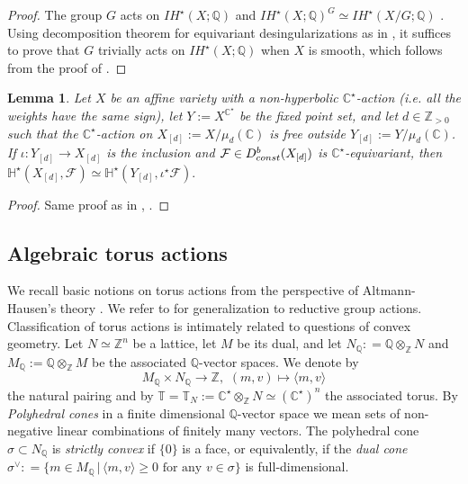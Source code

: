 \documentclass[11pt, reqno]{amsart}
\theoremstyle{plain}
\newtheorem{lemma}[theorem]{Lemma}
\theoremstyle{definition}
\theoremstyle{remark}
\begin{document}
\begin{proof}
The group $G$ acts on $IH^{\star}(X;\mathbb{Q})$ and $IH^{\star}(X;\mathbb{Q})^{G}\simeq IH^{\star}(X/G;\mathbb{Q})$ \cite[Lemma 2.12]{Kir86}.
Using decomposition theorem for equivariant desingularizations as in \cite{AW97}, it suffices 
to prove that $G$ trivially acts on $IH^{\star}(X;\mathbb{Q})$ when $X$ is smooth, which follows from the proof of \cite[Proposition 6.4]{DL76}. 
\end{proof}
\begin{lemma} \label{LemmaCstarfixepointLemma}
Let $X$ be an affine variety with a non-hyperbolic $\mathbb{C}^{\star}$-action (i.e. all the weights have the same sign), let 
$Y :=  X^{\mathbb{C}^{\star}}$ be the fixed point set, and let $d\in\mathbb{Z}_{>0}$ such that 
the $\mathbb{C}^{\star}$-action on $X_{[d]}:= X/\mu_{d}(\mathbb{C})$ is free outside $Y_{[d]}:=Y/\mu_{d}(\mathbb{C})$.
If $\iota: Y_{[d]}\rightarrow X_{[d]}$ is the inclusion and $\mathcal{F}\in D_{\rm const}^{b}(X_{[d]})$ is $\mathbb{C}^{\star}$-equivariant,  then 
$\mathbb{H}^{\star}(X_{[d]}, \mathcal{F}) \simeq \mathbb{H}^{\star}(Y_{[d]}, \iota^{\star}\mathcal{F}).$
\end{lemma}
\begin{proof}
Same proof as in \cite[Lemma 6.5]{DL91}, \cite[Lemma 4.2]{CMM18}.
\end{proof}


\subsection{Algebraic torus actions}\label{sec-class-act}
We recall basic notions on torus actions from the perspective of Altmann-Hausen's theory \cite{AIPSV12}. We refer to \cite{Tim97, LT16, Lan16} for generalization to reductive group actions.
\\

Classification of  torus actions is intimately related to questions of convex geometry.
Let $N\simeq \mathbb{Z}^{n}$ be a lattice, let $M$ be its dual, and let 
$N_{\mathbb{Q}}: =  \mathbb{Q}\otimes_{\mathbb{Z}}N$
and $M_{\mathbb{Q}}:= \mathbb{Q}\otimes_{\mathbb{Z}} M$ be the associated $\mathbb{Q}$-vector spaces.
We denote by
$$M_{\mathbb{Q}}\times N_{\mathbb{Q}}\rightarrow \mathbb{Z}, \,\, (m,v)\mapsto \langle m, v\rangle$$
the natural pairing and by
$\mathbb{T} = \mathbb{T}_{N}:= \mathbb{C}^{\star}\otimes_{\mathbb{Z}}N\simeq (\mathbb{C}^{\star})^{n}$ the associated torus.
By \emph{Polyhedral cones} in a finite dimensional $\mathbb{Q}$-vector space we mean sets of non-negative linear combinations of finitely many vectors. The polyhedral cone $\sigma\subset N_{\mathbb{Q}}$ is  \emph{strictly convex} if  $\{0\}$ is a face, or equivalently,  if the \emph{dual cone}
$\sigma^{\vee}: =  \{m\in M_{\mathbb{Q}}\, |\, \langle m, v\rangle \geq 0\text{ for any }v\in \sigma\} $
is full-dimensional.
\\
\end{document}
